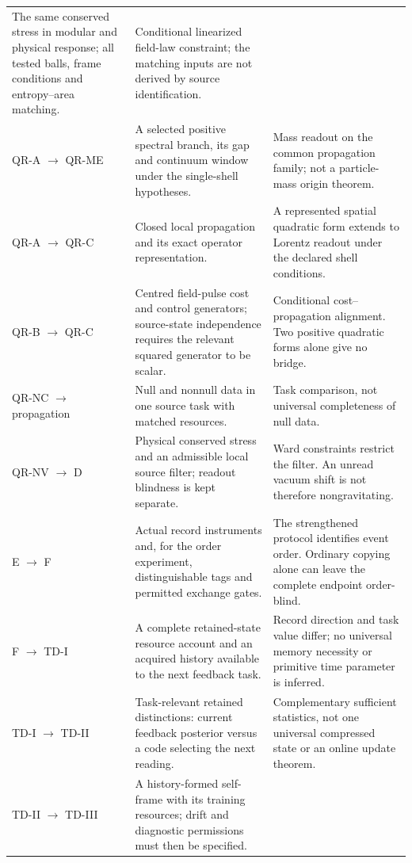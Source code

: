 \documentclass[11pt,a4paper]{article}
\begin{document}
\begin{longtable}{@{}P{.18\textwidth}P{.44\textwidth}P{.32\textwidth}@{}}
The same conserved stress in modular and physical response; all tested
balls, frame conditions and entropy--area matching. &
Conditional linearized field-law constraint; the matching inputs are
not derived by source identification.\\
QR-A $\to$ QR-ME \cite{QRAIFA,QRAIFME} &
A selected positive spectral branch, its gap and continuum window
under the single-shell hypotheses. &
Mass readout on the common propagation family; not a particle-mass
origin theorem.\\
QR-A $\to$ QR-C \cite{QRAIFA,QRAIFC} &
Closed local propagation and its exact operator representation. &
A represented spatial quadratic form extends to Lorentz readout under
the declared shell conditions.\\
QR-B $\to$ QR-C \cite{QRAIFB,QRAIFC} &
Centred field-pulse cost and control generators; source-state independence
requires the relevant squared generator to be scalar. &
Conditional cost--propagation alignment. Two positive quadratic forms
alone give no bridge.\\
QR-NC $\to$ propagation \cite{QRAIFNC,QRAIFA} &
Null and nonnull data in one source task with matched resources. &
Task comparison, not universal completeness of null data.\\
QR-NV $\to$ D \cite{QRAIFNV,HAFFD} &
Physical conserved stress and an admissible local source filter;
readout blindness is kept separate. &
Ward constraints restrict the filter. An unread vacuum shift is not
therefore nongravitating.\\
E $\to$ F \cite{HAFFE,HAFFF} &
Actual record instruments and, for the order experiment, distinguishable
tags and permitted exchange gates. &
The strengthened protocol identifies event order. Ordinary copying
alone can leave the complete endpoint order-blind.\\
F $\to$ TD-I \cite{HAFFF,TDOMEI} &
A complete retained-state resource account and an acquired history
available to the next feedback task. &
Record direction and task value differ; no universal memory necessity
or primitive time parameter is inferred.\\
TD-I $\to$ TD-II \cite{TDOMEI,TDOMEII} &
Task-relevant retained distinctions: current feedback posterior versus
a code selecting the next reading. &
Complementary sufficient statistics, not one universal compressed
state or an online update theorem.\\
TD-II $\to$ TD-III \cite{TDOMEII,TDOMEIII} &
A history-formed self-frame with its training resources; drift and
diagnostic permissions must then be specified. &

\end{longtable}
\end{document}
